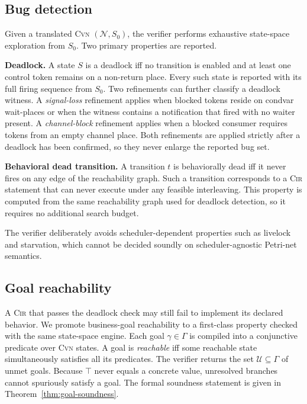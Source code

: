 \documentclass{article}
\begin{document}
\subsection{Bug detection}
\label{subsec:bug-detection}

Given a translated \textsc{Cvn} $(\mathcal{N},S_0)$, the verifier performs exhaustive state-space exploration from $S_0$. Two primary properties are reported.

\textbf{Deadlock.}\;
A state $S$ is a deadlock iff no transition is enabled and at least one control token remains on a non-return place. Every such state is reported with its full firing sequence from $S_0$. Two refinements can further classify a deadlock witness. A \emph{signal-loss} refinement applies when blocked tokens reside on condvar wait-places or when the witness contains a notification that fired with no waiter present. A \emph{channel-block} refinement applies when a blocked
consumer requires tokens from an empty channel place. Both refinements are applied strictly after a deadlock has been confirmed, so they never enlarge the reported bug set.

\textbf{Behavioral dead transition.}\;
A transition $t$ is behaviorally dead iff it never fires on any edge of the reachability graph. Such a transition corresponds to a \textsc{Cir} statement that can never execute under any feasible interleaving.  This property is computed from the same reachability graph used for deadlock detection, so it requires no additional search budget. 

The verifier deliberately avoids scheduler-dependent properties such as livelock and starvation, which cannot be decided soundly on scheduler-agnostic Petri-net semantics.

\subsection{Goal reachability}
\label{subsec:goal-reach}

A \textsc{Cir} that passes the deadlock check may still fail to implement its declared behavior. We promote business-goal reachability to a first-class property checked with the same state-space engine. Each goal $\gamma\in\Gamma$ is compiled into a conjunctive predicate over \textsc{Cvn} states. A goal is
\emph{reachable} iff some reachable state simultaneously satisfies all its predicates. The verifier returns the set $\mathcal{U}\subseteq\Gamma$ of unmet goals. Because $\top$ never equals a concrete value, unresolved branches cannot spuriously satisfy a goal. The formal soundness statement is given in Theorem~\ref{thm:goal-soundness}.
\end{document}
